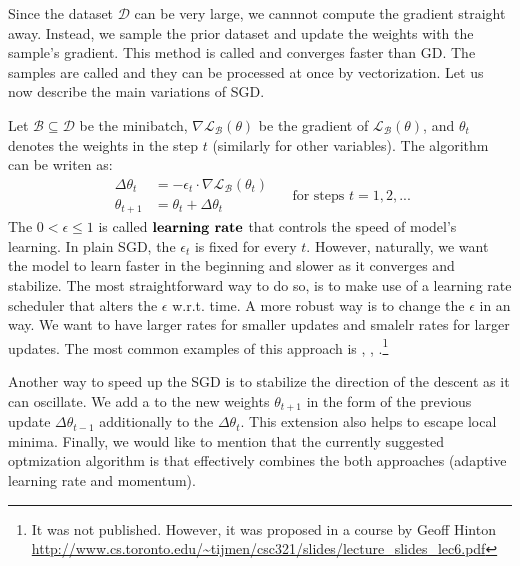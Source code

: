     Since the dataset $\mathcal{D}$ can be very large, we cannnot compute the
    gradient straight away. Instead, we sample the prior dataset and update the
    weights with the sample's gradient. This method is called  and converges faster than GD. The samples are called
     and they can be processed at once by vectorization. Let us now
    describe the main variations of SGD.

     Let $\mathcal{B} \subseteq \mathcal{D}$ be
    the minibatch, $\nabla\mathcal{L_\mathcal{B}(\theta)}$ be the gradient of
$\mathcal{L}_\mathcal{B}(\theta)$, and $\theta_t$ denotes the weights in the
    step $t$ (similarly for other variables). The algorithm can be writen as:
    $$
        \begin{array}{rl}
            \Delta\theta_{t} & = - \epsilon_{t} \cdot \nabla{\mathcal{L}_\mathcal{B}(\theta_{t})} \\
            \theta_{t+1}     & = \theta_{t} + \Delta\theta_{t}
        \end{array}
        \quad \text{ for steps } t = 1,2,...
    $$
    The $0 < \epsilon \leq 1$ is called $\textbf{learning rate}$ that controls the
    speed of model's learning. In plain SGD, the $\epsilon_t$ is fixed for every
$t$. However, naturally, we want the model to learn faster in the beginning and
    slower as it converges and stabilize. The most straightforward way to do so, is
    to make use of a learning rate scheduler that alters the $\epsilon$ w.r.t. time.
    A more robust way is to change the $\epsilon$ in an  way. We want
    to have larger rates for smaller updates and smalelr rates for larger updates.
    The most common examples of this approach is  \cite{adagrad},
     \cite{adadelta}, .\footnote{It was not published.
        However, it was proposed in a course by Geoff Hinton \url{
            http://www.cs.toronto.edu/~tijmen/csc321/slides/lecture_slides_lec6.pdf}
    }

    Another way to speed up the SGD is to stabilize the direction of the descent as
    it can oscillate. We add a  to the new weights $\theta_{t+1}$ in
    the form of the previous update $\Delta\theta_{t-1}$ additionally to the
$\Delta\theta_{t}$. This extension also helps to escape local minima. Finally,
    we would like to mention that the currently suggested optmization algorithm is
     \cite{adam} that effectively combines the both approaches (adaptive
    learning rate and momentum).


